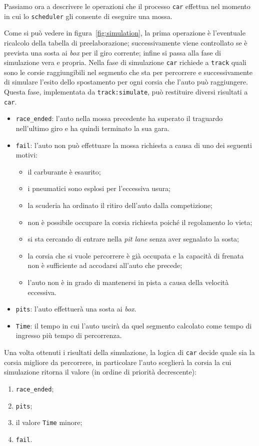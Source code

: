 \documentclass[a4paper]{report}
\newcommand{\fun}[1]{\texttt{#1}}
\begin{document}
Passiamo ora a descrivere le operazioni che il processo \texttt{car} effettua nel momento in cui lo \texttt{scheduler} gli consente di eseguire una mossa.

Come si può vedere in figura~\ref{fig:simulation}, la prima operazione è l'eventuale ricalcolo della tabella di preelaborazione; successivamente viene controllato se è prevista una sosta ai \textit{box} per il giro corrente; infine si passa alla fase di simulazione vera e propria. Nella fase di simulazione \texttt{car} richiede a \texttt{track} quali sono le corsie raggiungibili nel segmento che sta per percorrere e successivamente di simulare l'esito dello spostamento per ogni corsia che l'auto può raggiungere. Questa fase, implementata da \fun{track:simulate}, può restituire diversi risultati a \texttt{car}.
\begin{itemize}
\item \texttt{race\_ended}: l'auto nella mossa precedente ha superato il traguardo nell'ultimo giro e ha quindi terminato la sua gara.
\item \texttt{fail}: l'auto non può effettuare la mossa richiesta a causa di uno dei seguenti motivi:
	\begin{itemize}
	\item il carburante è esaurito;
	\item i pneumatici sono esplosi per l'eccessiva usura;
	\item la scuderia ha ordinato il ritiro dell'auto dalla competizione;
	\item non è possibile occupare la corsia richiesta poiché il regolamento lo vieta;
	\item si sta cercando di entrare nella \textit{pit lane} senza aver segnalato la sosta;
	\item la corsia che si vuole percorrere è già occupata e la capacità di frenata non è sufficiente ad accodarsi all'auto che precede;
	\item l'auto non è in grado di mantenersi in pista a causa della velocità eccessiva.
	\end{itemize}
\item \texttt{pits}: l'auto effettuerà una sosta ai \textit{box}.
\item \texttt{Time}: il tempo in cui l'auto uscirà da quel segmento calcolato come tempo di ingresso più tempo di percorrenza.
\end{itemize}
Una volta ottenuti i risultati della simulazione, la logica di \texttt{car} decide quale sia la corsia migliore da percorrere, in particolare l'auto sceglierà la corsia la cui simulazione ritorna il valore (in ordine di priorità decrescente):
\begin{enumerate}
\item \texttt{race\_ended};
\item \texttt{pits};
\item il valore \texttt{Time} minore;
\item \texttt{fail}.
\end{enumerate}
\end{document}
